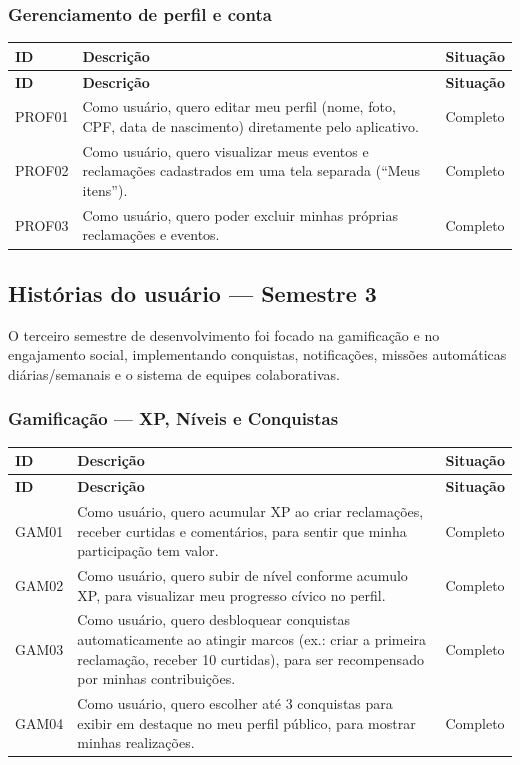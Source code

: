 \subsubsection{Gerenciamento de perfil e conta}

\begin{longtable}{|p{2cm}|p{9cm}|p{2.5cm}|}
  \hline
  \textbf{ID} & \textbf{Descrição} & \textbf{Situação} \\
  \hline
  \endfirsthead
  \hline
  \textbf{ID} & \textbf{Descrição} & \textbf{Situação} \\
  \hline
  \endhead
  PROF01 & Como usuário, quero editar meu perfil (nome, foto, CPF, data de nascimento) diretamente pelo aplicativo. & Completo \\
  \hline
  PROF02 & Como usuário, quero visualizar meus eventos e reclamações cadastrados em uma tela separada (``Meus itens''). & Completo \\
  \hline
  PROF03 & Como usuário, quero poder excluir minhas próprias reclamações e eventos. & Completo \\
  \hline
\end{longtable}

\subsection{Histórias do usuário — Semestre 3}

O terceiro semestre de desenvolvimento foi focado na gamificação e no engajamento
social, implementando conquistas, notificações, missões automáticas diárias/semanais
e o sistema de equipes colaborativas.

\subsubsection{Gamificação — XP, Níveis e Conquistas}

\begin{longtable}{|p{2cm}|p{9cm}|p{2.5cm}|}
  \hline
  \textbf{ID} & \textbf{Descrição} & \textbf{Situação} \\
  \hline
  \endfirsthead
  \hline
  \textbf{ID} & \textbf{Descrição} & \textbf{Situação} \\
  \hline
  \endhead
  GAM01 & Como usuário, quero acumular XP ao criar reclamações, receber curtidas e comentários, para sentir que minha participação tem valor. & Completo \\
  \hline
  GAM02 & Como usuário, quero subir de nível conforme acumulo XP, para visualizar meu progresso cívico no perfil. & Completo \\
  \hline
  GAM03 & Como usuário, quero desbloquear conquistas automaticamente ao atingir marcos (ex.: criar a primeira reclamação, receber 10 curtidas), para ser recompensado por minhas contribuições. & Completo \\
  \hline
  GAM04 & Como usuário, quero escolher até 3 conquistas para exibir em destaque no meu perfil público, para mostrar minhas realizações. & Completo \\
  \hline
\end{longtable}

